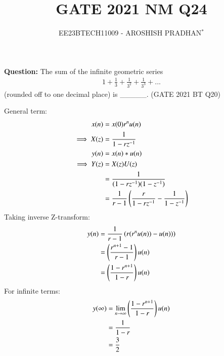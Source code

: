 \documentclass[journal,12pt,twocolumn]{IEEEtran}
\theoremstyle{remark}
\begin{document}

\vspace{3cm}

\title{GATE 2021 NM Q24}
\author{EE23BTECH11009 - AROSHISH PRADHAN$^{*}$%
}
\maketitle
\newpage
\bigskip
\textbf{Question:} The sum of the infinite geometric series
\begin{align}
    1 + \frac{1}{3} + \frac{1}{3^2} + \frac{1}{3^3} + ... \nonumber
\end{align}
(rounded off to one decimal place) is \_\_\_\_\_.
\hfill(GATE 2021 BT Q20)\\
\solution


General term:
\begin{align}
    x(n) &= x(0)r^nu(n)\\
    \implies X(z) &= \frac{1}{1-rz^{-1}}\\
    y(n) &= x(n) \ast u(n)\\
    \implies Y(z) &= X(z)U(z)\\
    &= \frac{1}{(1-rz^{-1})(1-z^{-1})}\\
    &= \frac{1}{r-1}\left(\frac{r}{1-rz^{-1}} - \frac{1}{1-z^{-1}}\right)\\
\end{align}
Taking inverse Z-transform:
\begin{align}
    y(n) &= \frac{1}{r-1}\left(r(r^nu(n)) - u(n))\right)\\
    &= \left(\frac{r^{n+1} - 1}{r - 1}\right)u(n)\\
    &= \left(\frac{1 - r^{n+1}}{1 -  r}\right)u(n)
\end{align}
For infinite terms:
\begin{align}
    y(\infty) &= \lim_{n \rightarrow \infty} \left(\frac{1 - r^{n+1}}{1 -  r}\right)u(n)\\
    &= \frac{1}{1-r}\\
    &= \frac{3}{2}
\end{align}
\end{document}
